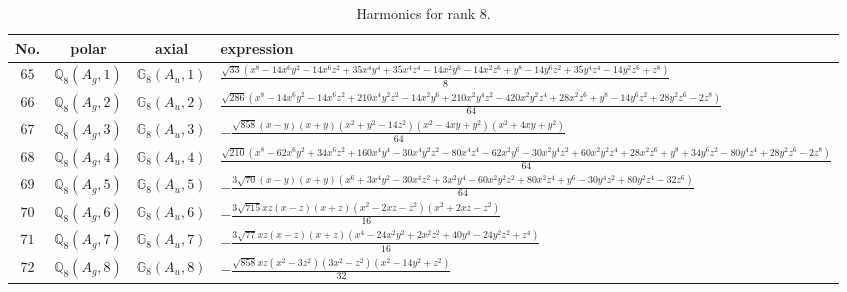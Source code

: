 \documentclass[fleqn,8pt,landscape]{jsarticle}
\begin{document}
\begin{table}[ht!]
\begin{center}
\caption{Harmonics for rank 8.}
\renewcommand{\arraystretch}{1.3}
\begin{tabular}{cccl} \hline \hline
No. & polar & axial & expression \\ \hline
$ 65 $ & $ \mathbb{Q}_{8}(A_{g},1) $ & $ \mathbb{G}_{8}(A_{u},1) $ & $ \frac{\sqrt{33} \left(x^{8} - 14 x^{6} y^{2} - 14 x^{6} z^{2} + 35 x^{4} y^{4} + 35 x^{4} z^{4} - 14 x^{2} y^{6} - 14 x^{2} z^{6} + y^{8} - 14 y^{6} z^{2} + 35 y^{4} z^{4} - 14 y^{2} z^{6} + z^{8}\right)}{8} $ \\
$ 66 $ & $ \mathbb{Q}_{8}(A_{g},2) $ & $ \mathbb{G}_{8}(A_{u},2) $ & $ \frac{\sqrt{286} \left(x^{8} - 14 x^{6} y^{2} - 14 x^{6} z^{2} + 210 x^{4} y^{2} z^{2} - 14 x^{2} y^{6} + 210 x^{2} y^{4} z^{2} - 420 x^{2} y^{2} z^{4} + 28 x^{2} z^{6} + y^{8} - 14 y^{6} z^{2} + 28 y^{2} z^{6} - 2 z^{8}\right)}{64} $ \\
$ 67 $ & $ \mathbb{Q}_{8}(A_{g},3) $ & $ \mathbb{G}_{8}(A_{u},3) $ & $ - \frac{\sqrt{858} \left(x - y\right) \left(x + y\right) \left(x^{2} + y^{2} - 14 z^{2}\right) \left(x^{2} - 4 x y + y^{2}\right) \left(x^{2} + 4 x y + y^{2}\right)}{64} $ \\
$ 68 $ & $ \mathbb{Q}_{8}(A_{g},4) $ & $ \mathbb{G}_{8}(A_{u},4) $ & $ \frac{\sqrt{210} \left(x^{8} - 62 x^{6} y^{2} + 34 x^{6} z^{2} + 160 x^{4} y^{4} - 30 x^{4} y^{2} z^{2} - 80 x^{4} z^{4} - 62 x^{2} y^{6} - 30 x^{2} y^{4} z^{2} + 60 x^{2} y^{2} z^{4} + 28 x^{2} z^{6} + y^{8} + 34 y^{6} z^{2} - 80 y^{4} z^{4} + 28 y^{2} z^{6} - 2 z^{8}\right)}{64} $ \\
$ 69 $ & $ \mathbb{Q}_{8}(A_{g},5) $ & $ \mathbb{G}_{8}(A_{u},5) $ & $ - \frac{3 \sqrt{70} \left(x - y\right) \left(x + y\right) \left(x^{6} + 3 x^{4} y^{2} - 30 x^{4} z^{2} + 3 x^{2} y^{4} - 60 x^{2} y^{2} z^{2} + 80 x^{2} z^{4} + y^{6} - 30 y^{4} z^{2} + 80 y^{2} z^{4} - 32 z^{6}\right)}{64} $ \\
$ 70 $ & $ \mathbb{Q}_{8}(A_{g},6) $ & $ \mathbb{G}_{8}(A_{u},6) $ & $ - \frac{3 \sqrt{715} x z \left(x - z\right) \left(x + z\right) \left(x^{2} - 2 x z - z^{2}\right) \left(x^{2} + 2 x z - z^{2}\right)}{16} $ \\
$ 71 $ & $ \mathbb{Q}_{8}(A_{g},7) $ & $ \mathbb{G}_{8}(A_{u},7) $ & $ - \frac{3 \sqrt{77} x z \left(x - z\right) \left(x + z\right) \left(x^{4} - 24 x^{2} y^{2} + 2 x^{2} z^{2} + 40 y^{4} - 24 y^{2} z^{2} + z^{4}\right)}{16} $ \\
$ 72 $ & $ \mathbb{Q}_{8}(A_{g},8) $ & $ \mathbb{G}_{8}(A_{u},8) $ & $ - \frac{\sqrt{858} x z \left(x^{2} - 3 z^{2}\right) \left(3 x^{2} - z^{2}\right) \left(x^{2} - 14 y^{2} + z^{2}\right)}{32} $ \\

\end{tabular}
\end{center}
\end{table}
\end{document}
